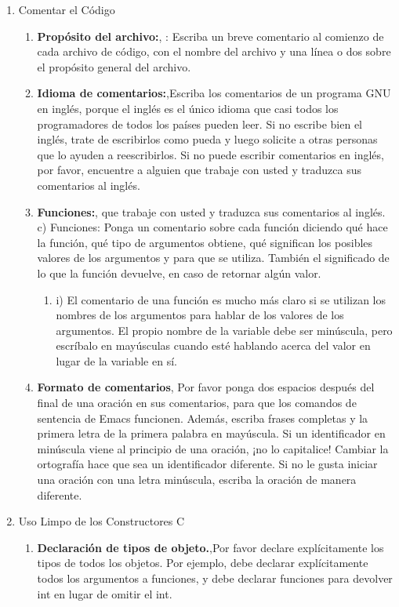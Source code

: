 \begin{enumerate}
\begin{enumerate}
	\end{enumerate}
	\item Comentar el Código
	\begin{enumerate}
	\item {\bf Propósito del archivo:}, : Escriba un breve comentario al comienzo de cada archivo de código, con el nombre del archivo y una línea o dos sobre el propósito general del archivo.
	\item {\bf Idioma de comentarios:},Escriba los comentarios de un programa GNU en inglés, porque el inglés es el único idioma que casi todos los programadores de todos los países pueden leer. Si no escribe bien el inglés, trate de escribirlos como pueda y luego solicite a otras personas que lo ayuden a reescribirlos. Si no puede escribir comentarios en inglés, por favor, encuentre a alguien que trabaje con usted y traduzca sus comentarios al inglés.
	\item {\bf Funciones:}, que trabaje con usted y traduzca sus comentarios al inglés.
c)	Funciones: Ponga un comentario sobre cada función diciendo qué hace la función, qué tipo de argumentos obtiene, qué significan los posibles valores de los argumentos y para que se utiliza. También el significado de lo que la función devuelve, en caso de retornar algún valor.
	\begin{enumerate}
	\item i)	El comentario de una función es mucho más claro si se utilizan los nombres de los argumentos para hablar de los valores de los argumentos. El propio nombre de la variable debe ser minúscula, pero escríbalo en mayúsculas cuando esté hablando acerca del valor en lugar de la variable en sí.
	\end{enumerate}
	\item {\bf Formato de comentarios}, Por favor ponga dos espacios después del final de una oración en sus comentarios, para que los comandos de sentencia de Emacs funcionen. Además, escriba frases completas y la primera letra de la primera palabra en mayúscula. Si un identificador en minúscula viene al principio de una oración, ¡no lo capitalice! Cambiar la ortografía hace que sea un identificador diferente. Si no le gusta iniciar una oración con una letra minúscula, escriba la oración de manera diferente.
	\end{enumerate}
	\item Uso Limpo de los Constructores C
	\begin{enumerate}
	\item {\bf Declaración de tipos de objeto.},Por favor declare explícitamente los tipos de todos los objetos. Por ejemplo, debe declarar explícitamente todos los argumentos a funciones, y debe declarar funciones para devolver int en lugar de omitir el int.

\end{enumerate}
\end{enumerate}
